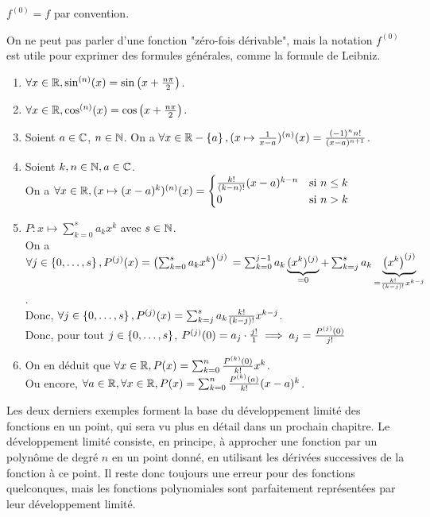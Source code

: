 \documentclass[12pt, a4paper]{report}
\begin{document}
\begin{remark}
    $f^{(0)} = f$ par convention.

    On ne peut pas parler d'une fonction "zéro-fois dérivable", mais la notation $f^{(0)}$ est utile pour exprimer des formules générales, comme la formule de Leibniz.
\end{remark}

\begin{example}
  \begin{enumerate}
    \item $\forall x \in \mathbb{R}, \sin^{(n)}(x) = \sin\left(x + \frac{n\pi}{2}\right)$.
    \item $\forall x \in \mathbb{R}, \cos^{(n)}(x) = \cos\left(x + \frac{n\pi}{2}\right)$.
    \item Soient $a\in\mathbb{C}$, $n\in\mathbb{N}$. On a $\forall x \in \mathbb{R}-\left\{a\right\}, (x\mapsto \frac1{x-a})^{(n)}(x)=\frac{(-1)^n n!}{(x-a)^{n+1}}$.
    \item Soient $k,n\in\mathbb{N}, a\in\mathbb{C}$.\\On a $\forall x \in \mathbb{R}, (x\mapsto (x-a)^k)^{(n)}(x) = \begin{cases}
        \frac{k!}{(k-n)!}(x-a)^{k-n} & \text{si } n \leq k\\
        0 & \text{si } n > k\end{cases}$
    \item $P:x\mapsto \sum_{k=0}^s a_kx^k$ avec $s\in\mathbb{N}$.\\On a $\forall j \in \left\{0,\dots,s\right\}, P^{(j)}(x) = \left(\sum_{k=0}^s a_k x^k\right)^{(j)} \\= \sum_{k=0}^{j-1} a_k \underbrace{(x^k)^{(j)}}_{=0} + \sum_{k=j}^s a_k\underbrace{\left(x^{k}\right)^{(j)}}_{=\frac{k!}{(k-j)!} x^{k-j}}$.\\Donc, $\forall j \in \left\{0,\dots,s\right\}, P^{(j)}(x) = \sum_{k=j}^s a_k \frac{k!}{(k-j)!} x^{k-j}$.\\Donc, pour tout $j\in\left\{0,\dots,s\right\}$, $P^{(j)}(0)=a_j\cdot \frac{j!}{1}\\ \implies a_j=\frac{P^{(j)}(0)}{j!}$
    \item On en déduit que $\forall x \in \mathbb{R}, P(x) = \sum_{k=0}^n \frac{P^{(k)}(0)}{k!} x^k$.\\Ou encore, $\forall a \in \mathbb{R}, \forall x \in \mathbb{R}, P(x) = \sum_{k=0}^n \frac{P^{(k)}(a)}{k!} (x-a)^k$.
  \end{enumerate}
\end{example}

\begin{remark}
  Les deux derniers exemples forment la base du développement limité des fonctions en un point, qui sera vu plus en détail dans un prochain chapitre. Le développement limité consiste, en principe, à approcher une fonction par un polynôme de degré $n$ en un point donné, en utilisant les dérivées successives de la fonction à ce point. Il reste donc toujours une erreur pour des fonctions quelconques, mais les fonctions polynomiales sont parfaitement représentées par leur développement limité.
\end{remark}
\end{document}
